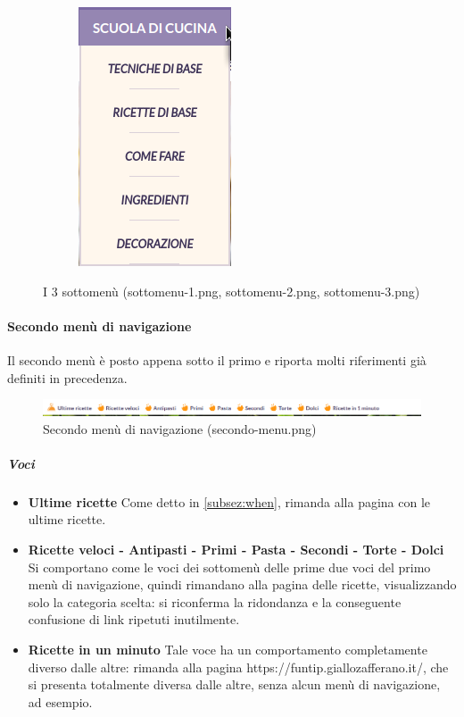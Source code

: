 \begin{figure}[h!]
\begin{subfigure}[b]{0.3\textwidth}
		\subcaption{}
	\end{subfigure}
	\begin{subfigure}[b]{0.3\textwidth}
		\includegraphics[scale=0.5]{images/sottomenu-3.png}
		\subcaption{}
	\end{subfigure}
	\caption{I 3 sottomenù (sottomenu-1.png, sottomenu-2.png, sottomenu-3.png)}
\end{figure}



\paragraph{Secondo menù di navigazione}

Il secondo menù è posto appena sotto il primo e riporta molti riferimenti già definiti in precedenza.

\begin{figure}[h!]
	\centerline{
	\includegraphics[scale=0.5]{images/secondo-menu.png}}
	\caption{Secondo menù di navigazione (secondo-menu.png)}
	\label{fig:secondo_menu}
\end{figure}

\subparagraph{Voci}

\begin{itemize}
	\item \textbf{Ultime ricette} Come detto in \ref{subsez:when}, rimanda alla pagina con le ultime ricette.
	\item \textbf{Ricette veloci - Antipasti - Primi - Pasta - Secondi - Torte - Dolci} Si comportano come le voci dei sottomenù delle prime due voci del primo menù di navigazione, quindi rimandano alla pagina delle ricette, visualizzando solo la categoria scelta: si riconferma la ridondanza e la conseguente confusione di link ripetuti inutilmente.
	\item \textbf{Ricette in un minuto} Tale voce ha un comportamento completamente diverso dalle altre: rimanda alla pagina https://funtip.giallozafferano.it/, che si presenta totalmente diversa dalle altre, senza alcun menù di navigazione, ad esempio.
\end{itemize}

